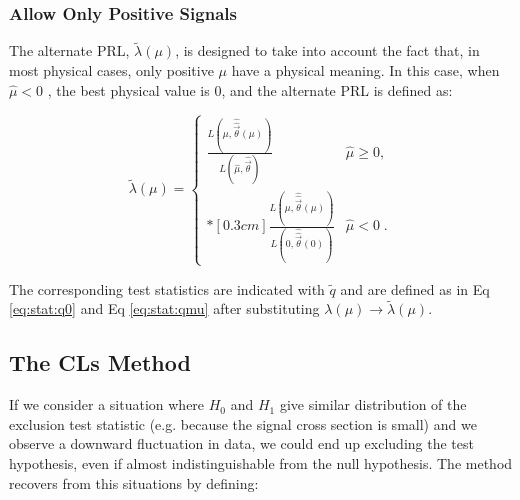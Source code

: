  
\subsubsection*{Allow Only Positive Signals}

The alternate PRL, $\tilde{\lambda}({\mu})$, is designed to take into account the fact that, in most physical cases, only positive $\mu$ have a physical meaning. In this case, when $\hat{\mu} < 0$ , the best physical value is 0, and the alternate PRL is defined as: 

\begin{equation}
\label{eq:stat:lik:alpexcl}
\tilde{\lambda}({\mu}) =
\left\{ \! \! \begin{array}{ll}
               \frac{ L(\mu,
               \hat{\hat{\vec{\theta}}}(\mu)) }
               {L(\hat{\mu}, \hat{\vec{\theta}}) }
                 & \hat{\mu} \ge 0 , \\*[0.3 cm]
                \frac{ L(\mu,
               \hat{\hat{\vec{\theta}}}(\mu)) }
               {L(0, \hat{\hat{\vec{\theta}}}(0)) }
 & \hat{\mu} < 0 \;.
              \end{array}
       \right.
\end{equation}

\noindent The corresponding test statistics are indicated with $\tilde{q}$ and are defined as in Eq \ref{eq:stat:q0} and Eq \ref{eq:stat:qmu} after substituting $\lambda({\mu}) \rightarrow \tilde{\lambda}({\mu})$.

\iffalse
\begin{equation}
\label{eq:stat:q:excl}
\qmu = - 2 \ln \tilde{\lambda}(\mu) =
\left\{ \! \! \begin{array}{ll}
               - 2 \ln \frac{L(\mu, \hat{\hat{\vec{\theta}}}(\mu))}
                {L(0, \hat{\hat{\theta}}(0))}
                & \quad \hat{\mu} < 0  \;, \\*[0.2 cm]
               -2 \ln \frac{L(\mu, \hat{\hat{\vec{\theta}}}(\mu))}
                {L(\hat{\mu}, \hat{\vec{\theta}})}
&  \quad \hat{\mu} \ge 0  \;.
              \end{array}
       \right.
\end{equation}
\fi

\subsection{The CLs Method}

If we consider a situation where $H_0$ and $H_1$ give similar distribution of the exclusion test statistic (e.g. because the signal cross section is
small) and we observe a downward fluctuation in data, we could end up excluding the test hypothesis, even if almost indistinguishable from the null hypothesis. The \cls method \cite{JUNK1999435} recovers from this situations by defining:

